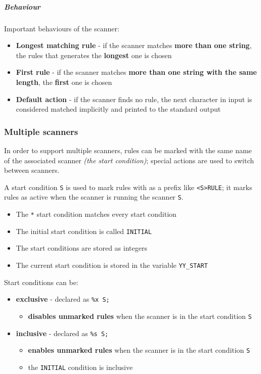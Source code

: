 \documentclass[english]{article}
\begin{document}
\subparagraph*{Behaviour}
Important behaviours of the scanner:

\begin{itemize}
  \item \textbf{Longest matching rule} - if the scanner matches \textbf{more than one string}, the rules that generates the \textbf{longest} one is chosen
  \item \textbf{First rule} - if the scanner matches\textbf{ more than one string with the same length}, the \textbf{first} one is chosen
  \item \textbf{Default action} - if the scanner finds no rule, the next character in input is considered matched implicitly and printed to the standard output
\end{itemize}

\subsubsection{Multiple scanners}

In order to support multiple scanners, rules can be marked with the same name of the associated scanner \textit{(the start condition)};
special actions are used to switch between scanners.

A start condition \texttt{S} is used to mark rules with as a prefix like \texttt{<S>RULE};
it marks rules as active when the scanner is running the scanner \texttt{S}.

\begin{itemize}
  \item The \texttt{*} start condition matches every start condition
  \item The initial start condition is called \texttt{INITIAL}
  \item The start conditions are stored as integers
  \item The current start condition is stored in the variable \texttt{YY\_START}
\end{itemize}

\bigskip
Start conditions can be:

\begin{itemize}[label=\texttt{>}]
  \item \textbf{exclusive} - declared as \texttt{\%x S;}
        \begin{itemize}
          \item \textbf{disables unmarked rules} when the scanner is in the start condition \texttt{S}
        \end{itemize}
  \item \textbf{inclusive} - declared as \texttt{\%s S;}
        \begin{itemize}
          \item \textbf{enables unmarked rules} when the scanner is in the start condition \texttt{S}
          \item the \texttt{INITIAL} condition is inclusive
        \end{itemize}
\end{itemize}
\end{document}
